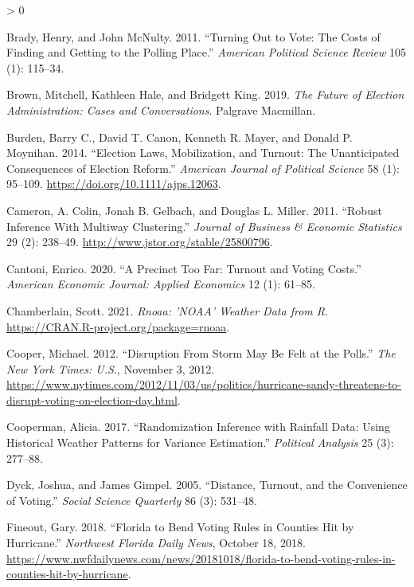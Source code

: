 \documentclass[
  12pt,
]{article}
\newlength{\cslhangindent}
\newenvironment{CSLReferences}[2] %
 {%
  \setlength{\parindent}{0pt}
  \ifodd #1 \everypar{\setlength{\hangindent}{\cslhangindent}}\ignorespaces\fi
  \ifnum #2 > 0
  \setlength{\parskip}{#2\baselineskip}
  \fi
 }%
 {}
\begin{document}
\hypertarget{refs}{}
\begin{CSLReferences}{1}{0}
\leavevmode\hypertarget{ref-Brady2011}{}%
Brady, Henry, and John McNulty. 2011. {``Turning Out to Vote: {The Costs} of {Finding} and {Getting} to the {Polling Place}.''} \emph{American Political Science Review} 105 (1): 115--34.

\leavevmode\hypertarget{ref-Brown2019}{}%
Brown, Mitchell, Kathleen Hale, and Bridgett King. 2019. \emph{The {Future} of {Election Administration}: {Cases} and {Conversations}}. {Palgrave Macmillan}.

\leavevmode\hypertarget{ref-Burden2014}{}%
Burden, Barry C., David T. Canon, Kenneth R. Mayer, and Donald P. Moynihan. 2014. {``Election {Laws}, {Mobilization}, and {Turnout}: {The Unanticipated Consequences} of {Election Reform}.''} \emph{American Journal of Political Science} 58 (1): 95--109. \url{https://doi.org/10.1111/ajps.12063}.

\leavevmode\hypertarget{ref-Cameron2011}{}%
Cameron, A. Colin, Jonah B. Gelbach, and Douglas L. Miller. 2011. {``Robust {Inference With Multiway Clustering}.''} \emph{Journal of Business \& Economic Statistics} 29 (2): 238--49. \url{http://www.jstor.org/stable/25800796}.

\leavevmode\hypertarget{ref-Cantoni2020}{}%
Cantoni, Enrico. 2020. {``A {Precinct Too Far}: {Turnout} and {Voting Costs}.''} \emph{American Economic Journal: Applied Economics} 12 (1): 61--85.

\leavevmode\hypertarget{ref-Chamberlain2021}{}%
Chamberlain, Scott. 2021. \emph{Rnoaa: '{NOAA}' {Weather Data} from {R}}. \url{https://CRAN.R-project.org/package=rnoaa}.

\leavevmode\hypertarget{ref-Cooper2012}{}%
Cooper, Michael. 2012. {``Disruption {From Storm May Be Felt} at the {Polls}.''} \emph{The New York Times: U.S.}, November 3, 2012. \url{https://www.nytimes.com/2012/11/03/us/politics/hurricane-sandy-threatens-to-disrupt-voting-on-election-day.html}.

\leavevmode\hypertarget{ref-Cooperman2017}{}%
Cooperman, Alicia. 2017. {``Randomization {Inference} with {Rainfall Data}: {Using Historical Weather Patterns} for {Variance Estimation}.''} \emph{Political Analysis} 25 (3): 277--88.

\leavevmode\hypertarget{ref-Dyck2005}{}%
Dyck, Joshua, and James Gimpel. 2005. {``Distance, {Turnout}, and the {Convenience} of {Voting}.''} \emph{Social Science Quarterly} 86 (3): 531--48.

\leavevmode\hypertarget{ref-Fineout2018}{}%
Fineout, Gary. 2018. {``Florida to Bend Voting Rules in Counties Hit by Hurricane.''} \emph{Northwest Florida Daily News}, October 18, 2018. \url{https://www.nwfdailynews.com/news/20181018/florida-to-bend-voting-rules-in-counties-hit-by-hurricane}.


\end{CSLReferences}
\end{document}

